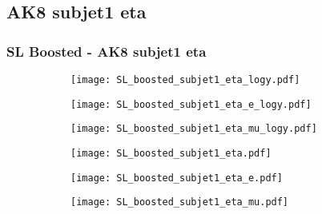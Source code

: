 \documentclass[aspectratio=169,8pt]{beamer}
\begin{document}
\subsection{AK8 subjet1 eta}
\begin{frame}
\frametitle{SL Boosted - AK8 subjet1 eta}
\begin{figure}
\captionsetup[subfigure]{labelformat=empty}
\begin{subfigure}{0.32\textwidth}
\texttt{[image: SL\_boosted\_subjet1\_eta\_logy.pdf]}
\vspace*{-0.15cm}
\end{subfigure}
\hfil
\begin{subfigure}{0.32\textwidth}
\texttt{[image: SL\_boosted\_subjet1\_eta\_e\_logy.pdf]}
\vspace*{-0.15cm}
\end{subfigure}
\hfil
\begin{subfigure}{0.32\textwidth}
\texttt{[image: SL\_boosted\_subjet1\_eta\_mu\_logy.pdf]}
\vspace*{-0.15cm}
\end{subfigure}
\hfil
\begin{subfigure}{0.32\textwidth}
\texttt{[image: SL\_boosted\_subjet1\_eta.pdf]}
\vspace*{-0.15cm}
\end{subfigure}
\hfil
\begin{subfigure}{0.32\textwidth}
\texttt{[image: SL\_boosted\_subjet1\_eta\_e.pdf]}
\vspace*{-0.15cm}
\end{subfigure}
\hfil
\begin{subfigure}{0.32\textwidth}
\texttt{[image: SL\_boosted\_subjet1\_eta\_mu.pdf]}
\vspace*{-0.15cm}
\end{subfigure}
\hfil
\end{figure}
\end{frame}
\newpage
\end{document}
